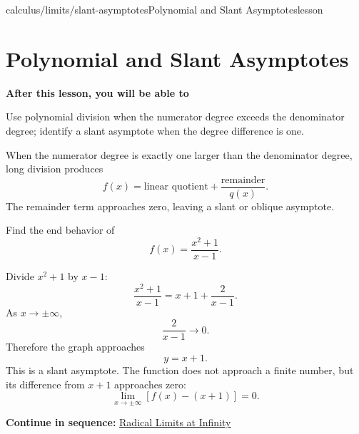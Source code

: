 \documentclass[11pt,openany]{book}
\theoremstyle{bgplain}
\newcounter{bgexample}[chapter]
\newcommand{\webnext}[2]{%
  \par\addvspace{1.2em}\noindent{\color{BGLine}\rule{\textwidth}{0.35pt}}\par\smallskip
  {\small\color{BGGray}\textbf{Continue in sequence:} \hyperlink{web:#1}{#2}}\par
}
\newcommand{\lessonobjective}[1]{%
  \par\Needspace{4\baselineskip}\addvspace{0.6em}%
  {\bfseries\color{BGInk}After this lesson, you will be able to}\par\smallskip
  #1\par\addvspace{0.5em}%
}
\begin{document}
\begin{webpage}{calculus/limits/slant-asymptotes}{Polynomial and Slant Asymptotes}{lesson}
\section{Polynomial and Slant Asymptotes}

\lessonobjective{
Use polynomial division when the numerator degree exceeds the denominator degree; identify a slant asymptote when the degree difference is one.
}

When the numerator degree is exactly one larger than the denominator degree, long division produces
\[
  f(x)=\text{linear quotient}+\frac{\text{remainder}}{q(x)}.
\]
The remainder term approaches zero, leaving a slant or oblique asymptote.

\begin{bgexample}[title={Slant asymptote by division}]
Find the end behavior of
\[
  f(x)=\frac{x^2+1}{x-1}.
\]

\begin{bgsolution}
Divide \(x^2+1\) by \(x-1\):
\[
  \frac{x^2+1}{x-1}=x+1+\frac2{x-1}.
\]
As \(x\to\pm\infty\),
\[
  \frac2{x-1}\to0.
\]
Therefore the graph approaches
\[
  \boxed{y=x+1}.
\]
This is a slant asymptote. The function does not approach a finite number, but its difference from \(x+1\) approaches zero:
\[
  \lim_{x\to\pm\infty}[f(x)-(x+1)]=0.
\]
\end{bgsolution}
\end{bgexample}
\webnext{calculus/limits/radicals-at-infinity}{Radical Limits at Infinity}
\end{webpage}
\end{document}
